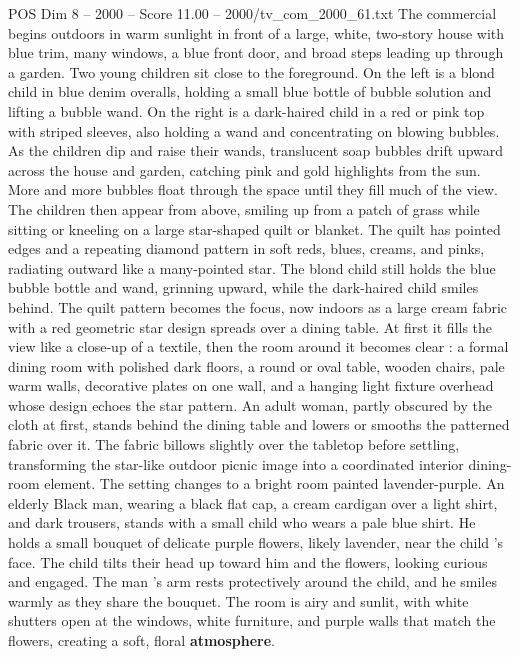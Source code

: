 \begin{textsample}{POS Dim 8 – 2000 – Score 11.00 – 2000/tv\_com\_2000\_61.txt}  \label{ex:f8_pos_003}
The commercial begins outdoors in warm sunlight in front of a large, white, two-story house with blue trim, many windows, a blue front door, and broad steps leading up through a garden.
Two young children sit close to the foreground.
On the left is a blond child in blue denim overalls, holding a small blue bottle of bubble solution and lifting a bubble wand.
On the right is a dark-haired child in a red or pink top with striped sleeves, also holding a wand and concentrating on blowing bubbles.
As the children dip and raise their wands, translucent soap bubbles drift upward across the house and garden, catching pink and gold highlights from the sun.
More and more bubbles float through the space until they fill much of the view.
The children then appear from above, smiling up from a patch of grass while sitting or kneeling on a large star-shaped quilt or blanket.
The quilt has pointed edges and a repeating diamond pattern in soft reds, blues, creams, and pinks, radiating outward like a many-pointed star.
The blond child still holds the blue bubble bottle and wand, grinning upward, while the dark-haired child smiles behind.
The quilt pattern becomes the focus, now indoors as a large cream fabric with a red geometric star design spreads over a dining table.
At first it fills the view like a close-up of a textile, then the room around it becomes clear : a formal dining room with polished dark floors, a round or oval table, wooden chairs, pale warm walls, decorative plates on one wall, and a hanging light fixture overhead whose design echoes the star pattern.
An adult woman, partly obscured by the cloth at first, stands behind the dining table and lowers or smooths the patterned fabric over it.
The fabric billows slightly over the tabletop before settling, transforming the star-like outdoor picnic image into a coordinated interior dining-room element.
The setting changes to a bright room painted lavender-purple.
An elderly Black man, wearing a black flat cap, a cream cardigan over a light shirt, and dark trousers, stands with a small child who wears a pale blue shirt.
He holds a small bouquet of delicate purple flowers, likely lavender, near the child ’s face.
The child tilts their head up toward him and the flowers, looking curious and engaged.
The man ’s arm rests protectively around the child, and he smiles warmly as they share the bouquet.
The room is airy and sunlit, with white shutters open at the windows, white furniture, and purple walls that match the flowers, creating a soft, floral \textbf{atmosphere}.

\end{textsample}
